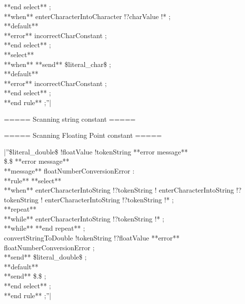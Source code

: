   **end select** ;\\ 
 **when** %
  enterCharacterIntoCharacter !?charValue !* ;\\ 
 **default**\\ 
  **error** incorrectCharConstant ;\\ 
 **end select** ;\\ 
 **select**\\ 
 **when** %
  **send** \$literal\_char\$ ;\\ 
 **default**\\ 
  **error** incorrectCharConstant ;\\ 
 **end select** ;\\ 
**end rule** ;''|

===== Scanning string constant =====

===== Scanning Floating Point constant =====

|''\$literal\_double\$ !floatValue !tokenString **error message** %
\\ 
\$.\$ **error message** %
\\ 
**message** floatNumberConversionError : %
\\ 
**rule** %
 **select**\\ 
 **when** %
  enterCharacterIntoString !?tokenString !%
  enterCharacterIntoString !?tokenString !%
  enterCharacterIntoString !?tokenString !* ;\\ 
  **repeat**\\ 
  **while** %
   enterCharacterIntoString !?tokenString !* ;\\ 
  **while** %
  **end repeat** ;\\ 
  convertStringToDouble !tokenString !?floatValue **error** floatNumberConversionError ;\\ 
  **send** \$literal\_double\$ ;\\ 
 **default**\\ 
  **send** \$.\$ ;\\ 
 **end select** ;\\
**end rule** ;''|

